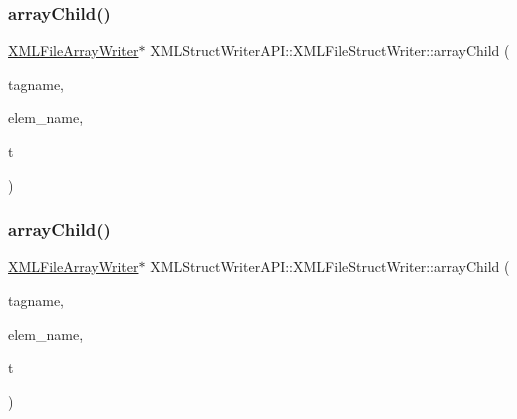 \subsubsection{\texorpdfstring{arrayChild()}{arrayChild()}\hspace{0.1cm}{\footnotesize\ttfamily [2/3]}}
{\footnotesize\ttfamily \mbox{\hyperlink{classXMLStructWriterAPI_1_1XMLFileArrayWriter}{X\+M\+L\+File\+Array\+Writer}}$\ast$ X\+M\+L\+Struct\+Writer\+A\+P\+I\+::\+X\+M\+L\+File\+Struct\+Writer\+::array\+Child (\begin{DoxyParamCaption}\item[{const std\+::string \&}]{tagname,  }\item[{const std\+::string \&}]{elem\+\_\+name,  }\item[{\mbox{\hyperlink{namespaceXMLStructWriterAPI_a2017208be87c77a32bdc19ea2f14d032}{Array\+Type}}}]{t }\end{DoxyParamCaption})}

\mbox{\label{classXMLStructWriterAPI_1_1XMLFileStructWriter_a45906f3eaab392974dde2da7cf1fef05}} 
\subsubsection{\texorpdfstring{arrayChild()}{arrayChild()}\hspace{0.1cm}{\footnotesize\ttfamily [3/3]}}
{\footnotesize\ttfamily \mbox{\hyperlink{classXMLStructWriterAPI_1_1XMLFileArrayWriter}{X\+M\+L\+File\+Array\+Writer}}$\ast$ X\+M\+L\+Struct\+Writer\+A\+P\+I\+::\+X\+M\+L\+File\+Struct\+Writer\+::array\+Child (\begin{DoxyParamCaption}\item[{const std\+::string \&}]{tagname,  }\item[{const std\+::string \&}]{elem\+\_\+name,  }\item[{\mbox{\hyperlink{namespaceXMLStructWriterAPI_a2017208be87c77a32bdc19ea2f14d032}{Array\+Type}}}]{t }\end{DoxyParamCaption})}

\mbox{\label{classXMLStructWriterAPI_1_1XMLFileStructWriter_a29ff0f4353991294bab0c75ab8895f73}} 
